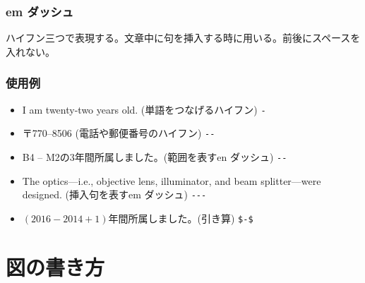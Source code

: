 \documentclass[a4j]{jsarticle}
\begin{document}
\subsubsection{em ダッシュ}
ハイフン三つで表現する。文章中に句を挿入する時に用いる。前後にスペースを入れない。

\subsubsection{使用例}
\begin{itemize}
 \item I am twenty-two years old. (単語をつなげるハイフン) \verb|-|
 \item 〒770--8506 (電話や郵便番号のハイフン)  \verb|--|
 \item B4 -- M2の3年間所属しました。(範囲を表すen ダッシュ) \verb|--|
 \item The optics---i.e., objective lens, illuminator, and beam splitter---were designed. (挿入句を表すem ダッシュ) \verb|---|
 \item $(2016-2014+1)$年間所属しました。(引き算) \verb|$-$|
\end{itemize}
\clearpage
\section{図の書き方}
\end{document}
